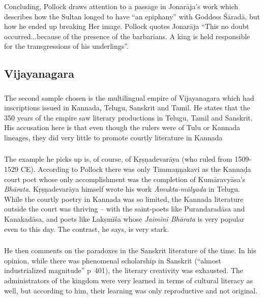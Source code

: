 \subsubsection{} Concluding, Pollock draws attention to a passage in Jonarāja’s work which describes how the Sultan longed to have “an epiphany” with Goddess Śāradā, but how he ended up breaking Her image. Pollock quotes Jonarāja “This no doubt occurred...because of the presence of the barbarians. A king is held responsible for the transgressions of his underlings”. 

\subsection{Vijayanagara}

\subsubsection{} The second sample chosen is the multilingual empire of Vijayanagara which had inscriptions issued in Kannada, Telugu, Sanskrit and Tamil. He states that the 350 years of the empire saw literary productions in Telugu, Tamil and Sanskrit. His accusation here is that even though the rulers were of Tulu or Kannada lineages, they did very little to promote courtly literature in Kannada
\newpage

\subsubsection{} The example he picks up is, of course, of Kṛṣṇadevarāya (who ruled from 1509-1529 CE). According to Pollock there was only Timmaṇṇakavi as the Kannaḍa court poet whose only accomplishment was the completion of Kumāravyāsa’s {\sl Bhārata}. Kṛṣṇadevarāya himself wrote his work {\sl Āmukta-mālyada} in Telugu. While the courtly poetry in Kannada was so limited, the Kannada literature outside the court was thriving – with the saint-poets like Purandaradāsa and Kanakadāsa, and poets like Lakṣmīśa whose {\sl Jaimini Bhārata} is very popular even to this day. The contrast, he says, is very stark.

\subsubsection{} He then comments on the paradoxes in the Sanskrit literature of the time. In his opinion, while there was phenomenal scholarship in Sanskrit (“almost industrialized magnitude” p~401), the literary creativity was exhausted. The administrators of the kingdom were very learned in terms of cultural literacy as well, but according to him, their learning was only reproductive and not original.

